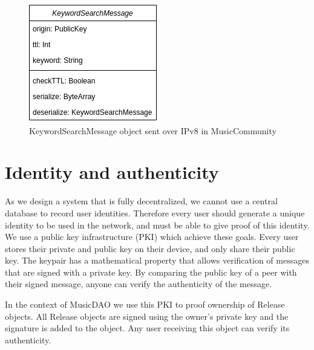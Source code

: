\begin{figure}
        \includegraphics[width=\linewidth]{design/KeywordSearchMessage-model.png}
        \caption{KeywordSearchMessage object sent over IPv8 in MusicCommunity}
        \label{fig:keyword-search-message-model}
    \endminipage\hfill
    \endminipage
\end{figure}

\section{Identity and authenticity}
\label{sec:pki-design}
As we design a system that is fully decentralized, we cannot use a central database to record user identities. Therefore every user should generate a unique identity to be used in the network, and must be able to give proof of this identity. We use a public key infrastructure (PKI) which achieve these goals. Every user stores their private and public key on their device, and only share their public key. The keypair has a mathematical property that allows verification of messages that are signed with a private key. By comparing the public key of a peer with their signed message, anyone can verify the authenticity of the message.

In the context of MusicDAO we use this PKI to proof ownership of Release objects. All Release objects are signed using the owner's private key and the signature is added to the object. Any user receiving this object can verify its authenticity.


